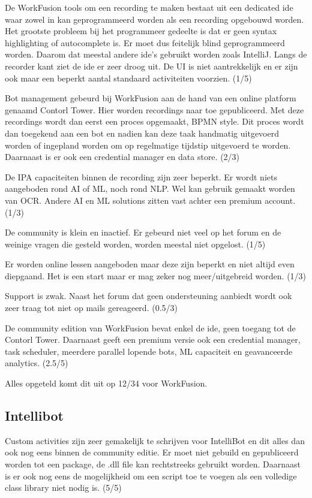 De WorkFusion tools om een recording te maken bestaat uit een dedicated ide waar zowel in kan geprogrammeerd worden als een recording opgebouwd worden. Het grootste probleem bij het programmeer gedeelte is dat er geen syntax highlighting of autocomplete is. Er moet dus feitelijk blind geprogrammeerd worden. Daarom dat meestal andere ide's gebruikt worden zoals IntelliJ. Langs de recorder kant ziet de ide er zeer droog uit. De UI is niet aantrekkelijk en er zijn ook maar een beperkt aantal standaard activiteiten voorzien. (1/5)

Bot management gebeurd bij WorkFusion aan de hand van een online platform genaamd Contorl Tower. Hier worden recordings naar toe gepubliceerd. Met deze recordings wordt dan eerst een proces opgemaakt, BPMN style. Dit proces wordt dan toegekend aan een bot en nadien kan deze taak handmatig uitgevoerd worden of ingepland worden om op regelmatige tijdstip uitgevoerd te worden. Daarnaast is er ook een credential manager en data store. (2/3)

De IPA capaciteiten binnen de recording zijn zeer beperkt. Er wordt niets aangeboden rond AI of ML, noch rond NLP. Wel kan gebruik gemaakt worden van OCR. Andere AI en ML solutions zitten vast achter een premium account. (1/3)

De community is klein en inactief. Er gebeurd niet veel op het forum en de weinige vragen die gesteld worden, worden meestal niet opgelost. (1/5)

Er worden online lessen aangeboden maar deze zijn beperkt en niet altijd even diepgaand. Het is een start maar er mag zeker nog meer/uitgebreid worden. (1/3)

Support is zwak. Naast het forum dat geen ondersteuning aanbiedt wordt ook zeer traag tot niet op mails gereageerd. (0.5/3)

De community edition van WorkFusion bevat enkel de ide, geen toegang tot de Contorl Tower. Daarnaast geeft een premium versie ook een credential manager, task scheduler, meerdere parallel lopende bots, ML capaciteit en geavanceerde analytics. (2.5/5)

Alles opgeteld komt dit uit op 12/34 voor WorkFusion.

\subsection{Intellibot}

Custom activities zijn zeer gemakelijk te schrijven voor IntelliBot en dit alles dan ook nog eens binnen de community editie. Er moet niet gebuild en gepubliceerd worden tot een package, de .dll file kan rechtstreeks gebruikt worden. Daarnaast is er ook nog eens de mogelijkheid om een script toe te voegen als een volledige class library niet nodig is. (5/5)

